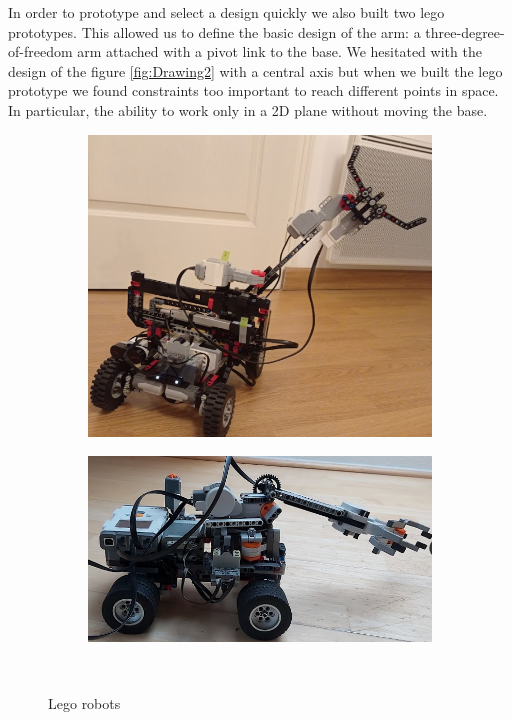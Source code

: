 In order to prototype and select a design quickly we also built two lego prototypes. This allowed us to define the basic design of the arm: a three-degree-of-freedom arm attached with a pivot link to the base. We hesitated with the design of the figure \ref{fig:Drawing2} with a central axis but when we built the lego prototype we found constraints too important to reach different points in space. In particular, the ability to work only in a 2D plane without moving the base.
\begin{figure}[H]
    \begin{subfigure}{.5\linewidth}
        \centering
        \includegraphics[scale = 0.2]{Images/Section03/Lego1.png}
        \caption{}
        \label{fig:Lego1}
    \end{subfigure}%
    \begin{subfigure}{.5\linewidth}
        \centering
        \includegraphics[scale = 0.3]{Images/Section03/Lego2.png}
        \caption{}
        \label{fig:Lego2}
    \end{subfigure}\\[1ex]
    \caption{Lego robots}
    \label{fig:Legos}
\end{figure}

